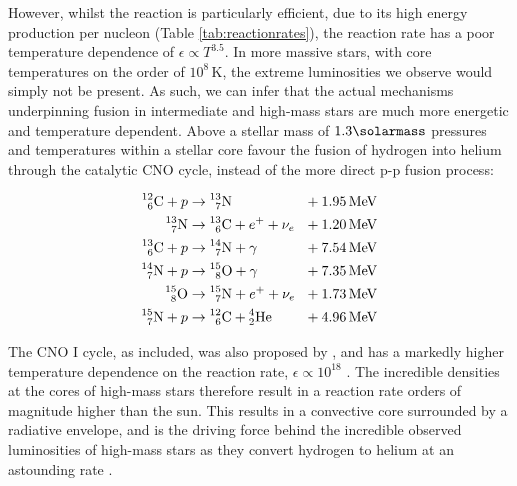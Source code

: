 \noindent
However, whilst the reaction is particularly efficient, due to its high energy production per nucleon (Table \ref{tab:reactionrates}), the reaction rate has a poor temperature dependence of $\epsilon \propto T^{3.5}$.
In more massive stars, with core temperatures on the order of $10^8 \, \si{\kelvin}$, the extreme luminosities we observe would simply not be present.
As such, we can infer that the actual mechanisms underpinning fusion in intermediate and high-mass stars are much more energetic and temperature dependent.
Above a stellar mass of $1.3 \si{\solarmass}$ pressures and temperatures within a stellar core favour the fusion of hydrogen into helium through the catalytic CNO cycle, instead of the more direct p-p fusion process:

\begin{equation}
  \begin{alignedat}{3}
    \prescript{12}{6}{\text C} + p & \rightarrow \prescript{13}{7}{\text N} && ~~ + \SI{1.95}{\mega\electronvolt} \\ 
    \prescript{13}{7}{\text N} & \rightarrow \prescript{13}{6}{\text C} + e^+ + \nu_e && ~~ + \SI{1.20}{\mega\electronvolt} \\
    \prescript{13}{6}{\text C} + p & \rightarrow \prescript{14}{7}{\text N} + \gamma && ~~ + \SI{7.54}{\mega\electronvolt} \\
    \prescript{14}{7}{\text N} + p & \rightarrow \prescript{15}{8}{\text O} + \gamma && ~~ + \SI{7.35}{\mega\electronvolt} \\
    \prescript{15}{8}{\text O} & \rightarrow \prescript{15}{7}{\text N} + e^+ + \nu_e && ~~ + \SI{1.73}{\mega\electronvolt} \\
    \prescript{15}{7}{\text N} + p & \rightarrow \prescript{12}{6}{\text C} + \prescript{4}{2}{\text {He}} && ~~ + \SI{4.96}{\mega\electronvolt}
  \end{alignedat}
\end{equation}

\noindent
The CNO I cycle, as included, was also proposed by \textcite{betheEnergyProductionStars1939}, and has a markedly higher temperature dependence on the reaction rate, $\epsilon \propto 10^{18}$
\parencite[Ch.~10]{wongIntroductoryNuclearPhysics1998}.
The incredible densities at the cores of high-mass stars therefore result in a reaction rate orders of magnitude higher than the sun.
This results in a convective core surrounded by a radiative envelope, and is the driving force behind the incredible observed luminosities of high-mass stars as they convert hydrogen to helium at an astounding rate \parencite[Ch.~5]{salarisEvolutionStarsStellar2005}.

